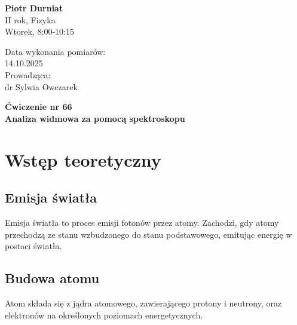 \documentclass[a4paper,12pt]{article}
\begin{document}
\noindent
\begin{minipage}{0.5\textwidth}
    \raggedright
    \textbf{Piotr Durniat} \\
    II rok, Fizyka \\
    Wtorek, 8:00-10:15 \\
    \vspace{0.5cm}
    \vspace{0.5cm}
\end{minipage}%
\begin{minipage}{0.5\textwidth}
    \raggedleft
    Data wykonania pomiarów: \\
    14.10.2025 \\
    \vspace{0.5cm}
    Prowadząca: \\
    dr Sylwia Owczarek
\end{minipage}

\vspace{2cm}
\begin{center}
    \LARGE \textbf{Ćwiczenie nr 66} \\[0.5cm]
    \Large \textbf{Analiza widmowa za pomocą spektroskopu}
\end{center}

\vspace{1cm} %
\noindent


\section{Wstęp teoretyczny}

\subsection*{Emisja światła}

Emisja światła to proces emisji fotonów przez atomy. Zachodzi, gdy atomy przechodzą ze stanu wzbudzonego do stanu podstawowego, emitując energię w postaci światła.~\cite{Drynski1976}

\subsection*{Budowa atomu}

Atom składa się z jądra atomowego, zawierającego protony i neutrony, oraz elektronów na określonych poziomach energetycznych.~\cite{Drynski1976}
\end{document}
